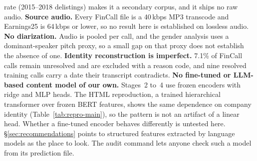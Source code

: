 rate (2015--2018 delistings) makes it a secondary corpus, and it ships no raw
audio. \textbf{Source audio.} Every FinCall file is a 40\,kbps MP3 transcode and
Earnings25 is 64\,kbps or lower, so no result here is established on lossless
audio. \textbf{No diarization.} Audio is pooled per call, and the gender analysis
uses a dominant-speaker pitch proxy, so a small gap on that proxy does not
establish the absence of one. \textbf{Identity reconstruction is
imperfect.} 7.1\% of FinCall calls remain unresolved and are excluded with a
reason code, and nine resolved training calls carry a date their transcript
contradicts.
\textbf{No fine-tuned or LLM-based content model of our own.} Stages~2 to~4 use frozen encoders with ridge and MLP heads. The HTML reproduction, a trained hierarchical transformer over frozen BERT features, shows the same dependence on company identity
(Table~\ref{tab:repro-main}), so the pattern is not an artifact of a linear head. Whether a fine-tuned encoder
behaves differently is untested here. \S\ref{sec:recommendations} points to structured features extracted by language models as the place to look. The audit command lets anyone check such a model from its prediction file.